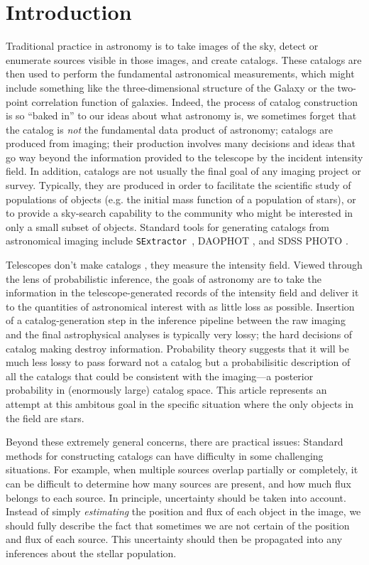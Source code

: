 \documentclass[manuscript]{aastex}
\newcommand{\sex}{{\tt SExtractor}}
\begin{document}
\section{Introduction}
Traditional practice in astronomy is to take images of the sky, detect
or enumerate sources visible in those images, and create catalogs.
These catalogs are then used to perform the fundamental astronomical
measurements, which might include something like the three-dimensional
structure of the Galaxy or the two-point correlation function of
galaxies.  Indeed, the process of catalog construction is so ``baked
in'' to our ideas about what astronomy is, we sometimes forget that
the catalog is \emph{not} the fundamental data product of astronomy; catalogs are produced
from imaging; their production involves many decisions and ideas
that go way beyond the information provided to the telescope by the
incident intensity field. In addition, catalogs are not usually the final
goal of any imaging project or survey. Typically, they are produced in
order to facilitate the scientific study of populations of objects (e.g. the
initial mass function of a population of stars), or to provide a sky-search
capability to the community who might be interested in only a small subset of
objects. Standard tools for generating catalogs from astronomical imaging
include \sex~\citep{sextractor}, DAOPHOT \citep{1987PASP...99..191S}, and SDSS
PHOTO \citep{photo}.

Telescopes don't make catalogs \citep{2011EAS....45..351H}, they
measure the intensity field.  Viewed through the lens of probabilistic
inference, the goals of astronomy are to take the information in the
telescope-generated records of the intensity field and deliver it to
the quantities of astronomical interest with as little loss as
possible.  Insertion of a catalog-generation step in the inference
pipeline between the raw imaging and the final astrophysical analyses
is typically very lossy; the hard decisions of catalog making destroy
information.  Probability theory suggests that it will be much less
lossy to pass forward not a catalog but a probabilisitic
description of all the catalogs that could be consistent with the
imaging---a posterior probability in (enormously large) catalog space.
This article represents an attempt at this ambitous goal in the specific
situation where the only objects in the field are stars.

Beyond these extremely general concerns, there are practical issues:
Standard methods for constructing catalogs can have difficulty in some
challenging situations. For example, when multiple sources overlap partially
or completely, it can be difficult to determine how many sources are present,
and how much flux belongs to each source. In principle, uncertainty should be
taken into account. Instead of simply {\it estimating} the position and flux of
each object in the image, we should fully describe the fact that sometimes we
are not certain of the position and flux of each source. This uncertainty
should then be propagated into any inferences about the stellar population.
\end{document}
